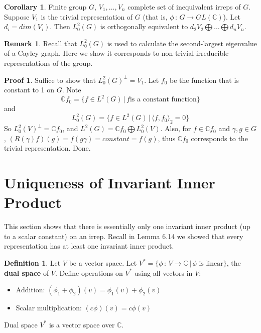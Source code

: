 \documentclass{book}
\newcommand{\C}{\mathbb{C}}
\newcommand{\define}[1]{\textbf{#1}}
\newcommand{\inner}[1]{\langle #1 \rangle}
\theoremstyle{definition}
\newtheorem{corollary}[lemma]{Corollary}
\newtheorem{definition}[lemma]{Definition}
\theoremstyle{remarkstyle}
\newtheorem*{remark}{Remark}%
\newtheorem*{myproof}{Proof}%
\begin{document}
\begin{corollary}
    Finite group $G$, $V_1,\dots,V_n$ complete set of inequivalent irreps of $G$. Suppose $V_1$ is the trivial representation of $G$ (that is, $\phi\,:\, G\rightarrow GL(\C)$). Let $d_i=dim(V_i)$. Then $L^2_0(G)$ is orthogonally equivalent to $d_2V_2\bigoplus\dots\bigoplus d_nV_n$. 
\end{corollary}
\begin{remark}
    Recall that $L^2_0(G)$ is used to calculate the second-largest eigenvalue of a Cayley graph. Here we show it corresponds to non-trivial irreducible representations of the group.
\end{remark}
\begin{myproof}
    Suffice to show that $L^2_0(G)^\perp = V_1$. Let $f_0$ be the function that is constant to 1 on $G$. Note
    $$
    \C f_0 = \{f\in L^2(G)\,\lvert\,\textrm{$f$is a constant function}\}
    $$
    and 
    $$
    L^2_0(G) = \{f\in L^2(G)\,\lvert\,\inner{f,f_0}_2=0\}
    $$
    So $L^2_0(V)^\perp=\C f_0$, and $L^2(G)=\C f_0\bigoplus L^2_0(V)$. Also, for $f\in \C f_0$ and $\gamma,g\in G$, $(R(\gamma)f)(g) = f(g\gamma) = constant = f(g) $, thus $\C f_0$ corresponds to the trivial representation. Done. \newline
\end{myproof}





\section{Uniqueness of Invariant Inner Product}
This section shows that there is essentially only one invariant inner product (up to a scalar constant) on an irrep. Recall in Lemma 6.14 we showed that every representation has at least one invariant inner product. \newline

\begin{definition}
    Let $V$ be a vector space. Let $V^*=\{\phi\,:\,V\rightarrow\C\,\lvert\,\textrm{$\phi$ is linear}\}$, the \define{dual space} of $V$. Define operations on $V^*$ using all vectors in $V$:
    \begin{itemize}
        \item Addition: $(\phi_1+\phi_2)(v)=\phi_1(v)+\phi_2(v)$
        \item Scalar multiplication: $(c\phi)(v)=c\phi(v)$
    \end{itemize}
    Dual space $V^*$ is a vector space over $\C$. \newline
\end{definition}
\end{document}

